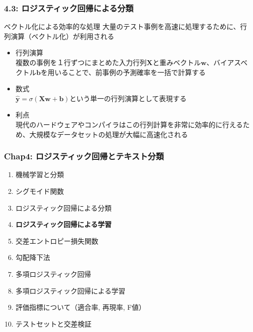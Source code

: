 \documentclass[unicode,11pt]{beamer} %
\begin{document}
\begin{frame}
    \frametitle{4.3: ロジスティック回帰による分類}
    \begin{alertblock}{ベクトル化による効率的な処理}
        大量のテスト事例を高速に処理するために、行列演算（ベクトル化）が利用される
        \begin{itemize}
            \item 行列演算\\複数の事例を１行ずつにまとめた入力行列$\boldsymbol{X}$と重みベクトル$\boldsymbol{w}$、バイアスベクトル$\boldsymbol{b}$を用いることで、前事例の予測確率を一括で計算する
            \item 数式\\$\boldsymbol{\hat{y}} = \sigma(\boldsymbol{X} \boldsymbol{w} + \boldsymbol{b})$という単一の行列演算として表現する
            \item 利点\\現代のハードウェアやコンパイラはこの行列計算を非常に効率的に行えるため、大規模なデータセットの処理が大幅に高速化される
        \end{itemize}
    \end{alertblock}
\end{frame}


\begin{frame}
    \frametitle{Chap4: ロジスティック回帰とテキスト分類}
    \begin{block}{}
        \begin{enumerate}
            \item 機械学習と分類
            \item シグモイド関数
            \item ロジスティック回帰による分類
            \item {\color{red}\textbf{ロジスティック回帰による学習}}
            \item 交差エントロピー損失関数
            \item 勾配降下法
            \item 多項ロジスティック回帰
            \item 多項ロジスティック回帰による学習
            \item 評価指標について（適合率, 再現率, F値）
            \item テストセットと交差検証
        \end{enumerate}
    \end{block}
\end{frame}
\end{document}
